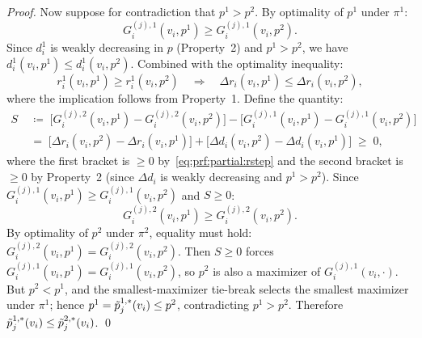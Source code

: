 \begin{proof}
Now suppose for contradiction that $p^1 > p^2$. By optimality of $p^1$ under $\pi^1$:
\[
G^{(j),1}_i(v_i, p^1) \ge G^{(j),1}_i(v_i, p^2).
\]
Since $d^1_i$ is weakly decreasing in $p$ (Property~2) and $p^1 > p^2$, we have $d^1_i(v_i, p^1) \le d^1_i(v_i, p^2)$. Combined with the optimality inequality:
\begin{equation}
\label{eq:prf:partial:rstep}
r^1_i(v_i, p^1) \ge r^1_i(v_i, p^2) \quad\Longrightarrow\quad \Delta r_i(v_i, p^1) \le \Delta r_i(v_i, p^2),
\end{equation}
where the implication follows from Property~1. Define the quantity:
\begin{align*}
S \;&\coloneqq\; \big[G^{(j),2}_i(v_i, p^1) - G^{(j),2}_i(v_i, p^2)\big] - \big[G^{(j),1}_i(v_i, p^1) - G^{(j),1}_i(v_i, p^2)\big] \\
&=\; \big[\Delta r_i(v_i, p^2) - \Delta r_i(v_i, p^1)\big] + \big[\Delta d_i(v_i, p^2) - \Delta d_i(v_i, p^1)\big] \;\ge\; 0,
\end{align*}
where the first bracket is $\ge 0$ by~\eqref{eq:prf:partial:rstep} and the second bracket is $\ge 0$ by Property~2 (since $\Delta d_i$ is weakly decreasing and $p^1 > p^2$). Since $G^{(j),1}_i(v_i, p^1) \ge G^{(j),1}_i(v_i, p^2)$ and $S \ge 0$:
\[
G^{(j),2}_i(v_i, p^1) \ge G^{(j),2}_i(v_i, p^2).
\]
By optimality of $p^2$ under $\pi^2$, equality must hold: $G^{(j),2}_i(v_i, p^1) = G^{(j),2}_i(v_i, p^2)$. Then $S \ge 0$ forces $G^{(j),1}_i(v_i, p^1) = G^{(j),1}_i(v_i, p^2)$, so $p^2$ is also a maximizer of $G^{(j),1}_i(v_i, \cdot)$. But $p^2 < p^1$, and the smallest-maximizer tie-break selects the smallest maximizer under $\pi^1$; hence $p^1 = \tilde{p}^{1,*}_j(v_i) \le p^2$, contradicting $p^1 > p^2$. Therefore $\tilde{p}^{1,*}_j(v_i) \le \tilde{p}^{2,*}_j(v_i)$.
\qed
\end{proof}

